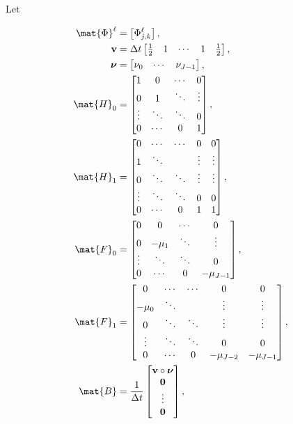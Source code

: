 \documentclass{jpmarticle}
\renewcommand{\vec}[1]{\boldsymbol{\mathrm{#1}}}
\let\subequationsorig\subequations%
\let\endsubequationsorig\endsubequations%
\renewenvironment{subequations}{
  \subequationsorig
  \renewcommand{\theequation}{\theparentequation.\arabic{equation}}
}{
  \endsubequationsorig
}
\begin{document}
Let
\begin{subequations}
  \begin{align}
    \mat{\Phi}^{\ell}
    &= \left[\Phi_{j, k}^{\ell}\right],
    \\
    \vec{v} &=
    \Delta t
    \begin{bmatrix}
      \frac{1}{2} & 1 & \cdots & 1 & \frac{1}{2}
    \end{bmatrix},
    \\
    \vec{\nu} &=
    \begin{bmatrix}
      \nu_0 & \cdots & \nu_{J - 1}
    \end{bmatrix},
    \\
    \mat{H}_0 &=
    \begin{bmatrix}
      1 & 0 & \cdots & 0
      \\
      0 & 1 & \ddots & \vdots
      \\
      \vdots & \ddots & \ddots & 0
      \\
      0 & \cdots & 0 & 1
    \end{bmatrix},
    \\
    \mat{H}_1 &=
    \begin{bmatrix}
      0 & \cdots & \cdots & 0 & 0
      \\
      1 & \ddots & & \vdots & \vdots
      \\
      0 & \ddots & \ddots & \vdots & \vdots
      \\
      \vdots & \ddots & \ddots & 0 & 0
      \\
      0 & \cdots & 0 & 1 & 1
    \end{bmatrix},
    \\
    \mat{F}_0 &=
    \begin{bmatrix}
      0 & 0 & \cdots & 0
      \\
      0 & - \mu_1 & \ddots & \vdots
      \\
      \vdots & \ddots & \ddots & 0
      \\
      0 & \cdots & 0 & - \mu_{J - 1}
    \end{bmatrix},
    \\
    \mat{F}_1 &=
    \begin{bmatrix}
      0 & \cdots & \cdots & 0 & 0
      \\
      - \mu_0 & \ddots & & \vdots & \vdots
      \\
      0 & \ddots & \ddots & \vdots & \vdots
      \\
      \vdots & \ddots & \ddots & 0 & 0
      \\
      0 & \cdots & 0 & - \mu_{J - 2} & - \mu_{J - 1}
    \end{bmatrix},
    \\
    \mat{B} &=
    \frac{1}{\Delta t}
    \begin{bmatrix}
      \vec{v} \circ \vec{\nu} \\ \vec{0} \\ \vdots \\ \vec{0}
    \end{bmatrix},
    \\
  \end{align}
\end{subequations}
\end{document}
